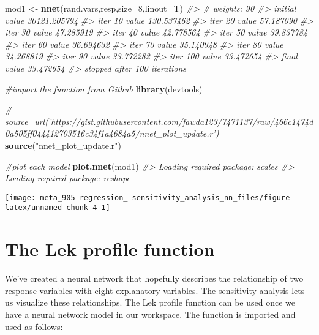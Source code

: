 \documentclass[]{book}
\newenvironment{Shaded}{\begin{snugshade}}{\end{snugshade}}
\newcommand{\CommentTok}[1]{\textcolor[rgb]{0.56,0.35,0.01}{\textit{#1}}}
\newcommand{\DataTypeTok}[1]{\textcolor[rgb]{0.13,0.29,0.53}{#1}}
\newcommand{\DecValTok}[1]{\textcolor[rgb]{0.00,0.00,0.81}{#1}}
\newcommand{\KeywordTok}[1]{\textcolor[rgb]{0.13,0.29,0.53}{\textbf{#1}}}
\newcommand{\NormalTok}[1]{#1}
\newcommand{\StringTok}[1]{\textcolor[rgb]{0.31,0.60,0.02}{#1}}
\begin{document}
\begin{Shaded}
\begin{Highlighting}[]
\NormalTok{mod1 <-}\StringTok{ }\KeywordTok{nnet}\NormalTok{(rand.vars,resp,}\DataTypeTok{size=}\DecValTok{8}\NormalTok{,}\DataTypeTok{linout=}\NormalTok{T)}
\CommentTok{#> # weights:  90}
\CommentTok{#> initial  value 30121.205794 }
\CommentTok{#> iter  10 value 130.537462}
\CommentTok{#> iter  20 value 57.187090}
\CommentTok{#> iter  30 value 47.285919}
\CommentTok{#> iter  40 value 42.778564}
\CommentTok{#> iter  50 value 39.837784}
\CommentTok{#> iter  60 value 36.694632}
\CommentTok{#> iter  70 value 35.140948}
\CommentTok{#> iter  80 value 34.268819}
\CommentTok{#> iter  90 value 33.772282}
\CommentTok{#> iter 100 value 33.472654}
\CommentTok{#> final  value 33.472654 }
\CommentTok{#> stopped after 100 iterations}
\end{Highlighting}
\end{Shaded}

\begin{Shaded}
\begin{Highlighting}[]
\CommentTok{#import the function from Github}
\KeywordTok{library}\NormalTok{(devtools)}

\CommentTok{# source_url('https://gist.githubusercontent.com/fawda123/7471137/raw/466c1474d0a505ff044412703516c34f1a4684a5/nnet_plot_update.r')}
\KeywordTok{source}\NormalTok{(}\StringTok{"nnet_plot_update.r"}\NormalTok{)}
 
\CommentTok{#plot each model}
\KeywordTok{plot.nnet}\NormalTok{(mod1)}
\CommentTok{#> Loading required package: scales}
\CommentTok{#> Loading required package: reshape}
\end{Highlighting}
\end{Shaded}

\begin{center}\texttt{[image: meta\_905-regression\_-sensitivity\_analysis\_nn\_files/figure-latex/unnamed-chunk-4-1]} \end{center}

\hypertarget{the-lek-profile-function}{%
\section{The Lek profile function}\label{the-lek-profile-function}}

We've created a neural network that hopefully describes the relationship of two response variables with eight explanatory variables. The sensitivity analysis lets us visualize these relationships. The Lek profile function can be used once we have a neural network model in our workspace. The function is imported and used as follows:
\end{document}
